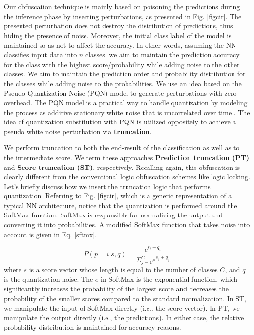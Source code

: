 \documentclass[10pt, twocolumn, conference]{IEEEtran}
\begin{document}
Our obfuscation technique is mainly based on poisoning the predictions during the inference phase by inserting perturbations, as presented in Fig. \ref{figcir}. The presented perturbation does not destroy the distribution of predictions, thus hiding the presence of noise. Moreover, the initial class label of the model is maintained so as not to affect the accuracy. In other words, assuming the NN classifies input data into $n$ classes, we aim to maintain the prediction accuracy for the class with the highest score/probability while adding noise to the other classes. We aim to maintain the prediction order and probability distribution for the classes while adding noise to the probabilities. We use an idea based on the Pseudo Quantization Noise (PQN) model to generate perturbations with zero overhead. The PQN model is a practical way to handle quantization by modeling the process as additive stationary white noise that is uncorrelated over time \cite{rfqnbk}. The idea of quantization substitution with PQN is utilized oppositely to achieve a pseudo white noise perturbation via \textbf{truncation}. 

We perform truncation to both the end-result of the classification as well as to the intermediate score. We term these approaches \textbf{Prediction truncation (PT)} and \textbf{Score truncation (ST)}, respectively. Recalling again, this obfuscation is clearly different from the conventional logic obfuscation schemes like logic locking. Let's briefly discuss how we insert the truncation logic that performs quantization. Referring to Fig. \ref{figcir}, which is a generic representation of a typical NN architecture, notice that the quantization is performed around the SoftMax function. SoftMax is responsible for normalizing the output and converting it into probabilities. A modified SoftMax function that takes noise into account is given in Eq. \ref{sftmx}.

\begin{equation} \label{sftmx}
P(p=i|s,q)=\frac{e^{s_{i}+q_{i}}}{\Sigma_{j=1}^{C}e^{s_{j}+q_{j}}}
\end{equation}
where $s$ is a score vector whose length is equal to the number of classes $C$, and $q$ is the quantization noise. The $e$ in SoftMax is the exponential function, which significantly increases the probability of the largest score and decreases the probability of the smaller scores compared to the standard normalization. In ST, we manipulate the input of SoftMax directly (i.e., the score vector). In PT, we manipulate the output directly (i.e., the predictions). In either case, the relative probability distribution is maintained for accuracy reasons.
\end{document}
